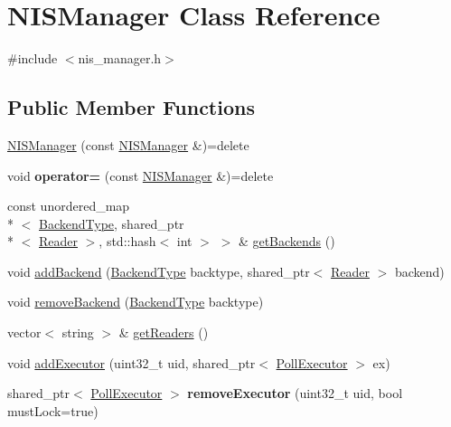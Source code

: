 \hypertarget{classNISManager}{\section{N\-I\-S\-Manager Class Reference}
\label{classNISManager}
}


{\ttfamily \#include $<$nis\-\_\-manager.\-h$>$}

\subsection*{Public Member Functions}
\begin{DoxyCompactItemize}
\item 
\hyperlink{classNISManager_a5694196f1df5f18ab9a2c8061075175e}{N\-I\-S\-Manager} (const \hyperlink{classNISManager}{N\-I\-S\-Manager} \&)=delete
\item 
\hypertarget{classNISManager_af191b49bf25bbf9bfd2cb5bd9cd9c434}{void {\bfseries operator=} (const \hyperlink{classNISManager}{N\-I\-S\-Manager} \&)=delete}\label{classNISManager_af191b49bf25bbf9bfd2cb5bd9cd9c434}

\item 
const unordered\-\_\-map\\*
$<$ \hyperlink{nis__types_8h_acee299fbb7d897867808250049524594}{Backend\-Type}, shared\-\_\-ptr\\*
$<$ \hyperlink{classcie_1_1nis_1_1Reader}{Reader} $>$, std\-::hash$<$ int $>$ $>$ \& \hyperlink{classNISManager_a6cad1a44e5ca799fc820c40fecd5cbf2}{get\-Backends} ()
\item 
void \hyperlink{classNISManager_a16f0f685a40a858762febd50f158b0ab}{add\-Backend} (\hyperlink{nis__types_8h_acee299fbb7d897867808250049524594}{Backend\-Type} backtype, shared\-\_\-ptr$<$ \hyperlink{classcie_1_1nis_1_1Reader}{Reader} $>$ backend)
\item 
void \hyperlink{classNISManager_ae1ff32a0e450569a8091fb5373874d7e}{remove\-Backend} (\hyperlink{nis__types_8h_acee299fbb7d897867808250049524594}{Backend\-Type} backtype)
\item 
vector$<$ string $>$ \& \hyperlink{classNISManager_a27a3db14eb804948d4031f115d3f6234}{get\-Readers} ()
\item 
void \hyperlink{classNISManager_a40aeca3b6e971ecb75495e2eae06c967}{add\-Executor} (uint32\-\_\-t uid, shared\-\_\-ptr$<$ \hyperlink{structPollExecutor}{Poll\-Executor} $>$ ex)
\item 
\hypertarget{classNISManager_a5d3721ef41e981161364b5c33eeccfc6}{shared\-\_\-ptr$<$ \hyperlink{structPollExecutor}{Poll\-Executor} $>$ {\bfseries remove\-Executor} (uint32\-\_\-t uid, bool must\-Lock=true)}\label{classNISManager_a5d3721ef41e981161364b5c33eeccfc6}


\end{DoxyCompactItemize}

